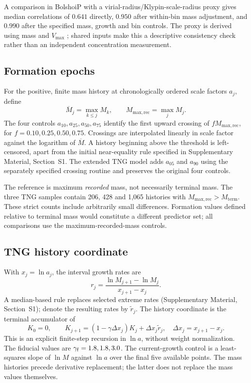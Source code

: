 \documentclass[11pt,a4paper]{article}
\newcommand{\Mrec}{M_{\mathrm{max,rec}}}
\newcommand{\Mterm}{M_{\mathrm{term}}}
\begin{document}
A comparison in BolshoiP with a virial-radius/Klypin-scale-radius proxy gives median correlations of $0.641$ directly, $0.950$ after within-bin mass adjustment, and $0.990$ after the specified mass, growth and bin controls. The proxy is derived using mass and $V_{\max}$ \citep{CosmoSpec}; shared inputs make this a descriptive consistency check rather than an independent concentration measurement.

\subsection{Formation epochs}
For the positive, finite mass history at chronologically ordered scale factors $a_j$, define
\begin{equation}
\overline M_j=\max_{k\leq j}M_k,\qquad \Mrec=\max_j M_j.\label{eq:recordedmax}
\end{equation}
The four controls $a_{10},a_{25},a_{50},a_{75}$ identify the first upward crossing of $f\Mrec$, for $f=0.10,0.25,0.50,0.75$. Crossings are interpolated linearly in scale factor against the logarithm of $\overline M$. A history beginning above the threshold is left-censored, apart from the initial near-equality rule specified in Supplementary Material, Section~S1. The extended TNG model adds $a_{05}$ and $a_{90}$ using the separately specified crossing routine and preserves the original four controls.

The reference is maximum \emph{recorded} mass, not necessarily terminal mass. The three TNG samples contain 206, 428 and 1,065 histories with $\Mrec>\Mterm$. These strict counts include arbitrarily small differences. Formation values defined relative to terminal mass would constitute a different predictor set; all comparisons use the maximum-recorded-mass controls.

\subsection{TNG history coordinate}
With $x_j=\ln a_j$, the interval growth rates are
\begin{equation}
r_j=\frac{\ln M_{j+1}-\ln M_j}{x_{j+1}-x_j}.
\end{equation}
A median-based rule replaces selected extreme rates (Supplementary Material, Section~S1); denote the resulting rates by $\widetilde r_j$. The history coordinate is the terminal accumulator of
\begin{equation}
K_0=0,\qquad K_{j+1}=(1-\gamma\Delta x_j)K_j+\Delta x_j\widetilde r_j,\quad\Delta x_j=x_{j+1}-x_j.\label{eq:tng}
\end{equation}
This is an explicit finite-step recursion in $\ln a$, without weight normalization. The fiducial values are $\gamma_{\rm f}=1.8,1.8,3.0$. The current-growth control is a least-squares slope of $\ln M$ against $\ln a$ over the final five available points. The mass histories precede derivative replacement; the latter does not replace the mass values themselves.
\end{document}

